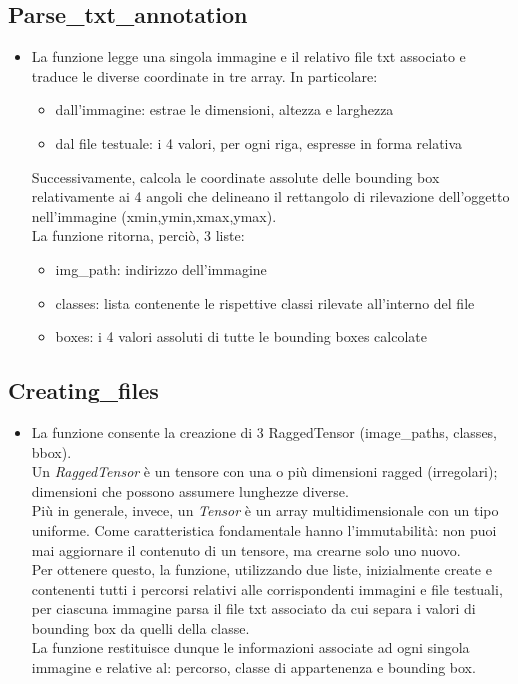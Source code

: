 \documentclass{report}
\begin{document}
\subsection{Parse\_txt\_annotation}
\begin{itemize}
\item La funzione legge una singola immagine e il relativo file txt associato e traduce le diverse coordinate in tre array. In particolare:
\begin{itemize}
\item dall'immagine: estrae le dimensioni, altezza e larghezza
\item dal file testuale: i 4 valori, per ogni riga, espresse in forma relativa
\end{itemize} 
Successivamente, calcola le coordinate assolute delle bounding box relativamente ai 4 angoli che delineano il rettangolo di rilevazione dell'oggetto nell'immagine (xmin,ymin,xmax,ymax). \\
La funzione ritorna, perciò, 3 liste:
\begin{itemize}
\item img\_path: indirizzo dell'immagine
\item classes: lista contenente le rispettive classi rilevate all'interno del file
\item boxes: i 4 valori assoluti di tutte le bounding boxes calcolate
\end{itemize} 
\end{itemize} 

\subsection{Creating\_files}
\begin{itemize}
\item La funzione consente la creazione di 3 RaggedTensor (image\_paths, classes, bbox).\\
Un {\itshape RaggedTensor} è un tensore con una o più dimensioni ragged (irregolari); dimensioni che possono assumere lunghezze diverse.\\
Più in generale, invece, un {\itshape Tensor} è un array multidimensionale con un tipo uniforme. Come caratteristica fondamentale hanno l'immutabilità: non puoi mai aggiornare il contenuto di un tensore, ma crearne solo uno nuovo.\\
Per ottenere questo, la funzione, utilizzando due liste, inizialmente create e contenenti tutti i percorsi relativi alle corrispondenti immagini e file testuali, per ciascuna immagine parsa il file txt associato da cui separa i valori di bounding box da quelli della classe.\\
La funzione restituisce dunque le informazioni associate ad ogni singola immagine e relative al: percorso, classe di appartenenza e bounding box.
\end{itemize}
\end{document}
